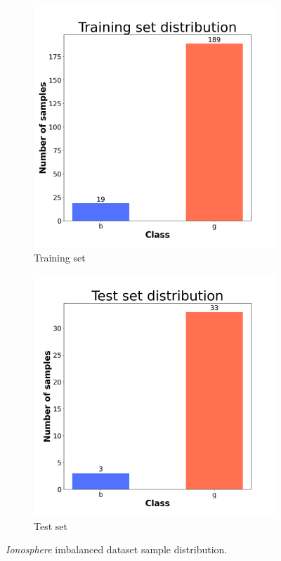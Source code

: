 \begin{figure}[H]
    \centering
    \begin{subfigure}[t]{0.45\textwidth}
        \centering
        \includegraphics[width=1\textwidth]{images/exper2/Ionosphere/train_dist.png}
        \caption{Training set}
    \end{subfigure}
    \begin{subfigure}[t]{0.45\textwidth}
        \centering
        \includegraphics[width=1\textwidth]{images/exper2/Ionosphere/test_dist.png}
        \caption{Test set}
    \end{subfigure}
    \caption{\textit{Ionosphere} imbalanced dataset sample distribution.}
\end{figure}

